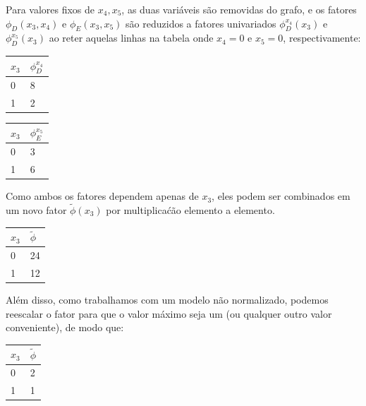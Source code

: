 \begin{exenumerate}
\begin{solution}
        Para valores fixos de $x_4, x_5$, as duas vari\'aveis s\~ao removidas
        do grafo, e os fatores $\phi_D(x_3,x_4)$ e $\phi_E(x_3, x_5)$ s\~ao
        reduzidos a fatores univariados $\phi_D^{x_4}(x_3)$ e $\phi_D^{x_5}(x_3)$
        ao reter aquelas linhas na tabela onde $x_4=0$ e $x_5=0$, respectivamente:
        \begin{center}
            \begin{tabular}{ll}
                \toprule
                $x_3$ & $\phi_D^{x_4}$\\
                \midrule
                0 & 8\\
                1 & 2\\
                \bottomrule
            \end{tabular}
            \hspace{4ex}
            \begin{tabular}{ll}
                \toprule
                $x_3$ & $\phi_E^{x_5}$\\
                \midrule
                0 & 3\\
                1 & 6\\
                \bottomrule
            \end{tabular}   
        \end{center}
        Como ambos os fatores dependem apenas de $x_3$, eles podem ser combinados em um novo fator $\tilde{\phi}(x_3)$ por multiplica\'c\~ao elemento a elemento.
        \begin{center}
            \begin{tabular}{ll}
                \toprule
                $x_3$ & $\tilde{\phi}$\\
                \midrule
                0 & 24\\
                1 & 12\\
                \bottomrule
            \end{tabular}
        \end{center}
        Al\'em disso, como trabalhamos com um modelo n\~ao normalizado, podemos reescalar o fator para que o valor m\'aximo seja um (ou qualquer outro valor conveniente), de modo que:
        \begin{center}
            \begin{tabular}{ll}
                \toprule
                $x_3$ & $\tilde{\phi}$\\
                \midrule
                0 & 2\\
                1 & 1\\

\end{tabular}
\end{center}
\end{solution}
\end{exenumerate}

